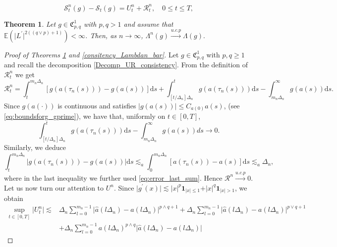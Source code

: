\documentclass[10pt,a4paper]{amsart}
\newtheorem{theorem}{Theorem}
\begin{document}
		\begin{equation}
			\mathcal{S}_{t}^{n}(g)-\mathcal{S}_{t}(g)=U_{t}^{n}+\mathcal{R}_{t}^{n},\quad0\leq t\leq T,\label{Decomp_UR_consistency}  
		\end{equation}

		\begin{theorem}\label{consitency_Lambdan} Let $g\in\mathfrak{C}_{p,q}^{1}$
			with $p,q>1$ and assume that $\mathbb{E}(\rvert L^{\prime}\rvert^{2((q\lor p)+1)})<\infty$.
			Then, as $n\rightarrow\infty$, $\Lambda^{n}(g)\overset{u.c.p}{\rightarrow}\Lambda(g).$\end{theorem}

		\begin{proof}[Proof of Theorems  \ref{consitency_Lambdan} and \ref{consitency_Lambdan_bar}]
			Let $g\in\mathfrak{C}_{p,q}^{1}$ with $p,q\geq1$ and recall the decomposition \eqref{Decomp_UR_consistency}. From the definition of $\mathcal{R}_{t}^{n}$ we get 
			\begin{equation}	
				\mathcal{R}_{t}^{n}=\int_{t}^{m_{n}\Delta_{n}}[g(a(\tau_{n}(s)))-g(a(s))]\mathrm{d}s+\int_{[t/\Delta_{n}]\Delta_{n}}^{t}g(a(\tau_{n}(s)))\mathrm{d}s-\int_{m_{n}\Delta_{n}}^{\infty}g(a(s))\mathrm{d}s.
				\label{eq:dec_Rn}
			\end{equation}
			Since $g(a(\cdot))$	is continuous and satisfies $\rvert g(a(s))\rvert\leq C_{a(0)}a(s)$,  (see \eqref{eq:boundsforg_gprime}), 
			we have that, uniformly on $t\in[0,T]$,
			\[
			\int_{[t/\Delta_{n}]\Delta_{n}}^{t}g(a(\tau_{n}(s)))\mathrm{d}s-\int_{m_{n}\Delta_{n}}^{\infty}g(a(s))ds\rightarrow0.
			\]
			Similarly, we deduce 
			\[
			\int_{t}^{m_{n}\Delta_{n}}\rvert g(a(\tau_{n}(s)))-g(a(s))\rvert\mathrm{d}s \lesssim_{a}\int_{0}^{m_{n}\Delta_{n}}[a(\tau_{n}(s))-a(s)]\mathrm{d}s
			\lesssim_{a}\Delta_{n},
			\]
			where in the last inequality we further used \eqref{eq:error_last_sum}.
			Hence $\mathcal{R}^{n}\overset{u.c.p}{\rightarrow}0$. Let us now turn our attention to $U^n$. Since $\rvert g^{\prime}(x)\rvert\lesssim\rvert x\rvert^{p}\mathbf{1}_{\rvert x\rvert\leq1}+\rvert x\rvert^{q}\mathbf{1}_{\rvert x\rvert>1}$,
			we obtain
			\begin{equation}
				\begin{aligned}\sup_{t\in[0,T]}\rvert U_{t}^{n}\rvert\lesssim & \Delta_{n}\sum_{l=0}^{m_{n}-1}\rvert\hat{a}(l\Delta_{n})-a(l\Delta_{n})\rvert^{p\land q+1}+\Delta_{n}\sum_{l=0}^{m_{n}-1}\rvert\hat{a}(l\Delta_{n})-a(l\Delta_{n})\rvert^{p\lor q+1}\\
					& +\Delta_{n}\sum_{l=0}^{m_{n}-1}a(l\Delta_{n})^{p\land q}\rvert\hat{a}(l\Delta_{n})-a(l\Delta_{n})\rvert

\end{aligned}
\end{equation}
\end{proof}
\end{document}
